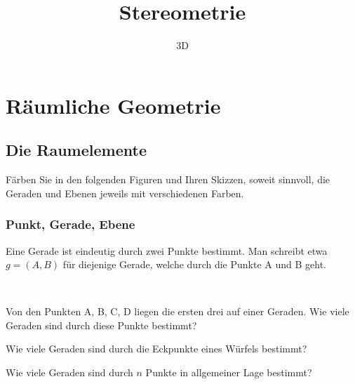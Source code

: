 \documentclass[%
11pt,%
twoside,%
titlepage,%
a4page,%
german,%
headsepline%
]{scrartcl}
\title{Stereometrie}
\subtitle{3D}
\author{}
\date{}
\begin{document}
\maketitle
\tableofcontents
\cleardoublepage

\section{R\"aumliche Geometrie}
\subsection{Die Raumelemente}
\begin{bem}
F\"arben Sie in den folgenden Figuren und Ihren Skizzen, soweit sinnvoll, die Geraden und Ebenen jeweils mit verschiedenen Farben.
\end{bem}
\subsubsection{Punkt, Gerade, Ebene}
\begin{center}
\end{center}

Eine Gerade ist eindeutig durch zwei Punkte bestimmt. Man schreibt etwa $g=(A,B)$ f\"ur diejenige Gerade, welche durch die Punkte A und B geht.

\begin{ueb} \ \\[-4ex]
\begin{enumeratea}
\item Von den Punkten A, B, C, D liegen die ersten drei auf einer Geraden. Wie viele Geraden sind durch diese Punkte bestimmt?
\item Wie viele Geraden sind durch die Eckpunkte eines W\"urfels bestimmt?
\item Wie viele Geraden sind durch $n$ Punkte in allgemeiner Lage bestimmt?
\end{enumeratea}
\end{ueb}
\end{document}
